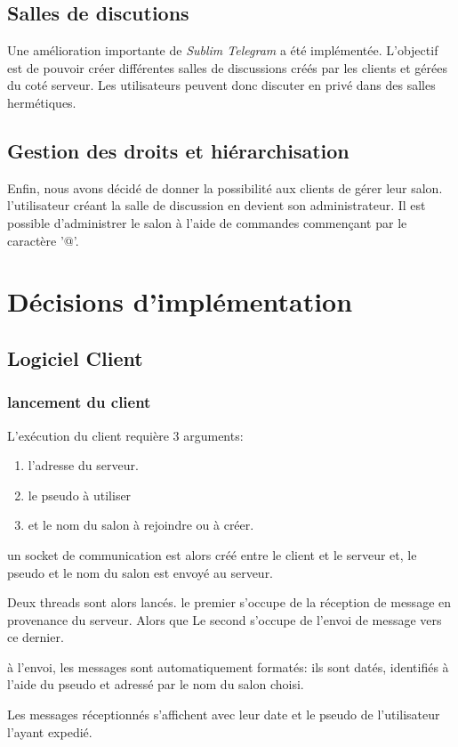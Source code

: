 \documentclass[a4paper, 12pt]{article}
\begin{document}
\subsection{Salles de discutions}
Une amélioration importante de \emph{Sublim Telegram} a été implémentée. L'objectif est de pouvoir créer différentes salles de discussions créés par les clients et gérées du coté serveur. Les utilisateurs peuvent donc discuter en privé dans des salles hermétiques.
\subsection{Gestion des droits et hiérarchisation}
Enfin, nous avons décidé de donner la possibilité aux clients de gérer leur salon. l'utilisateur créant la salle de discussion en devient son administrateur. Il est possible d'administrer le salon à l'aide de commandes commençant par le caractère '@'. 

\section{Décisions d'implémentation}
\subsection{Logiciel Client}
\subsubsection{lancement du client}
L'exécution du client requière 3 arguments:
\begin{enumerate}
    \item l'adresse du serveur.
    \item le pseudo à utiliser
    \item et le nom du salon à rejoindre ou à créer.
\end{enumerate}
un socket de communication est alors créé entre le client et le serveur et, le pseudo et le nom du salon est envoyé au serveur.

Deux threads sont alors lancés. le premier s'occupe de la réception de message en provenance du serveur. Alors que Le second s'occupe de l'envoi de message vers ce dernier.

à l'envoi, les messages sont automatiquement formatés: ils sont datés, identifiés à l'aide du pseudo et adressé par le nom du salon choisi. 

Les messages réceptionnés s'affichent avec leur date et le pseudo de l'utilisateur l'ayant expedié.
\end{document}
